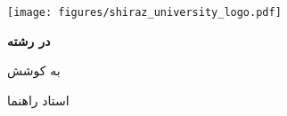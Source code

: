 \begin{titlepage}
    \centering
    \texttt{[image: figures/shiraz\_university\_logo.pdf]}

    \vspace{\baselineskip}
    \textbf{\persiandepartment}

    \textbf{{\persiantype} {\persiandegree} در رشته \\ {\persianfield}}

    \vspace{3\baselineskip}
    \textbf{\large \persiantitle}

    \vspace{3\baselineskip}
    به کوشش \\
    \textbf{\persianname}

    \vspace{2\baselineskip}
    استاد راهنما \\
    \textbf{\persiansupervisor}

    \vspace{\baselineskip}
    \textbf{\persiandate}
\end{titlepage}
